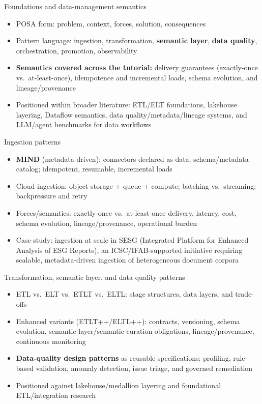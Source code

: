 \documentclass[aspectratio=169]{beamer}
\begin{document}
\begin{frame}{Foundations and data-management semantics}
  \begin{itemize}
    \item POSA form: problem, context, forces, solution, consequences
    \item Pattern language: ingestion, transformation, \textbf{semantic layer}, \textbf{data quality}, orchestration, promotion, observability
    \item \textbf{Semantics covered across the tutorial:} delivery guarantees (exactly-once vs.\ at-least-once), idempotence and incremental loads, schema evolution, and lineage/provenance
    \item Positioned within broader literature: ETL/ELT foundations, lakehouse layering, Dataflow semantics, data quality/metadata/lineage systems, and LLM/agent benchmarks for data workflows
  \end{itemize}
\end{frame}

\begin{frame}{Ingestion patterns}
  \begin{itemize}
    \item \textbf{MIND} (metadata-driven): connectors declared as data; schema/metadata catalog; idempotent, resumable, incremental loads
    \item Cloud ingestion: object storage + queue + compute; batching vs.\ streaming; backpressure and retry
    \item Forces/semantics: exactly-once vs.\ at-least-once delivery, latency, cost, schema evolution, lineage/provenance, operational burden
    \item Case study: ingestion at scale in SESG (Integrated Platform for Enhanced Analysis of ESG Reports), an ICSC/IFAB-supported initiative requiring scalable, metadata-driven ingestion of heterogeneous document corpora
  \end{itemize}
\end{frame}

\begin{frame}{Transformation, semantic layer, and data quality patterns}
  \begin{itemize}
    \item ETL vs.\ ELT vs.\ ETLT vs.\ ELTL: stage structures, data layers, and trade-offs
    \item Enhanced variants (ETLT++/ELTL++): contracts, versioning, schema evolution, semantic-layer/semantic-curation obligations, lineage/provenance, continuous monitoring
    \item \textbf{Data-quality design patterns} as reusable specifications: profiling, rule-based validation, anomaly detection, issue triage, and governed remediation
    \item Positioned against lakehouse/medallion layering and foundational ETL/integration research
  \end{itemize}
\end{frame}
\end{document}
